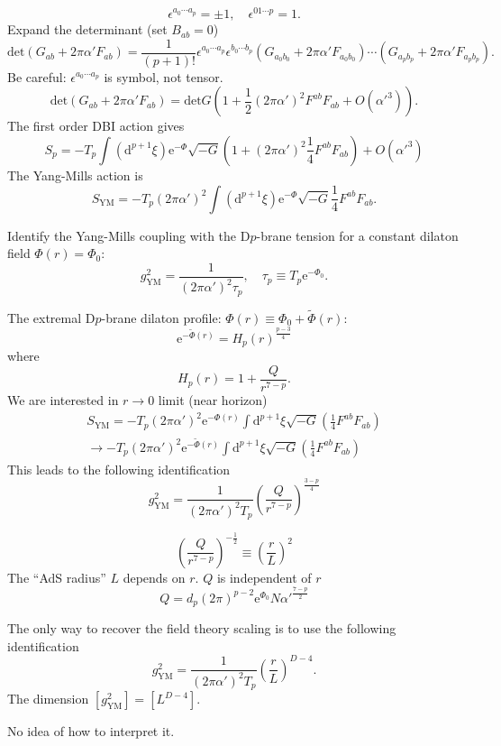 \[
	\epsilon^{a_0\cdots a_p} = \pm 1,\quad \epsilon^{01\cdots p}=1
.\] 
Expand the determinant (set $B_{ab}=0$)
\[
	\mathrm{det} (G_{ab} + 2\pi\alpha' F_{ab})
	= \frac{1}{(p+1)!}\epsilon^{a_0\cdots a_p}\epsilon^{b_0\cdots b_p}
	(G_{a_0 b_0} + 2\pi\alpha' F_{a_0 b_0})
	\cdots
	(G_{a_p b_p} + 2\pi\alpha' F_{a_p b_p})
.\] 
Be careful: $\epsilon^{a_0\cdots a_p}$ is symbol, not tensor.
\[
	\mathrm{det}(G_{ab} + 2\pi\alpha' F_{ab})
	= \mathrm{det}G \left( 1 + \frac{1}{2} (2\pi\alpha')^2 F^{ab}F_{ab}+ O(\alpha'^3)
 \right).\] 
The first order DBI action gives
\begin{equation}
	S_p = - T_p \int (\mathrm{d}^{p+1}\xi )\mathrm{e}^{-\Phi}
	\sqrt{-G} \left( 1 + (2\pi\alpha')^2 \frac{1}{4}F^{ab}F_{ab} \right) 
	+ O(\alpha'^3)
\end{equation}
The Yang-Mills action is
\begin{equation}
	S_{\text{YM}} = - T_p (2\pi\alpha')^2\int (\mathrm{d}^{p+1}\xi)
	\mathrm{e}^{-\Phi}\sqrt{-G} \frac{1}{4}F^{ab}F_{ab}.
\end{equation}

Identify the Yang-Mills coupling with the D$p$-brane tension
for a constant dilaton field $\Phi(r) = \Phi_0$:
\[
	g_{\text{YM}}^2 = \frac{1}{(2\pi\alpha')^2\tau_p},\quad \tau_p \equiv
	T_p \mathrm{e}^{-\Phi_0}
.\] 

The extremal D$p$-brane dilaton profile: $\Phi(r) \equiv \Phi_0 + \tilde{\Phi}(r)$:
\begin{equation}
	\mathrm{e}^{-\tilde{\Phi}(r)} = H_p(r)^{\frac{p-3}{4}}
\end{equation}
where \[
	H_p(r) = 1 + \frac{Q}{r^{7-p}}
.\] 
We are interested in $r\to 0$ limit (near horizon)
\begin{align*}
	S_{\text{YM}} = -T_p (2\pi\alpha')^2 \mathrm{e}^{-\Phi(r)}
	\int \mathrm{d}^{p+1}\xi \sqrt{-G} \left( \frac{1}{4}F^{ab}F_{ab} \right) 
	\\
	\to -T_p (2\pi\alpha')^2 \mathrm{e}^{-\tilde{\Phi}(r)}
	\int \mathrm{d}^{p+1}\xi \sqrt{-G} \left( \frac{1}{4}F^{ab}F_{ab} \right) 
\end{align*}
This leads to the following identification
\begin{equation}
	g_{\text{YM}}^2 = \frac{1}{(2\pi\alpha')^2 T_p}
	\left( \frac{Q}{r^{7-p}} \right)^{\frac{3-p}{4}}
\end{equation}

\begin{equation}
	\left( \frac{Q}{r^{7-p}} \right)^{-\frac{1}{2}} \equiv \left( \frac{r}{L} \right)^2
\end{equation}
The ``AdS radius'' $L$ depends on $r$.
$Q$ is independent of $r$
\begin{equation*}
	Q  = d_p (2\pi)^{p-2} \mathrm{e}^{\Phi_0} N {\alpha'}^{\frac{7-p}{2}}
\end{equation*}

The only way to recover the field theory scaling is to use the following identification
\[
	g_{\text{YM}}^2 = \frac{1}{(2\pi\alpha')^2 T_p}
	\left( \frac{r}{L} \right)^{D-4}
.\] 
The dimension $[g_{\text{YM}}^2] = [L^{D-4}]$.

No idea of how to interpret it.
